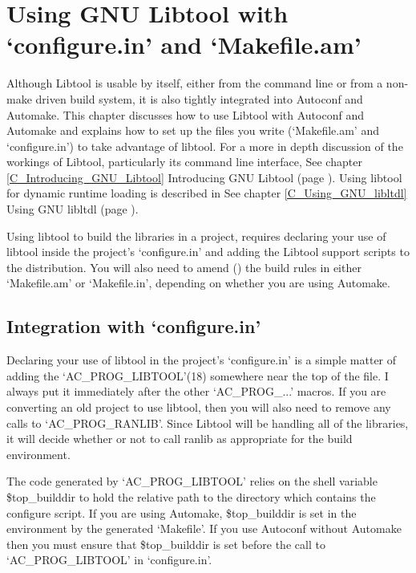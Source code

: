 \chapter{Using GNU Libtool with `configure.in' and `Makefile.am'}\label{C_Using GNU Libtool with}


Although Libtool is usable by itself, either from the command line or from 
a non-make driven build system, it is also tightly integrated into Autoconf 
and Automake. This chapter discusses how to use Libtool with Autoconf and 
Automake and explains how to set up the files you write (`Makefile.am' 
and `configure.in') to take advantage of libtool. For a more in depth 
discussion of the workings of Libtool, particularly its command line interface,
See chapter \ref{C_Introducing_GNU_Libtool} Introducing GNU Libtool
(page \pageref{C_Introducing_GNU_Libtool}). Using libtool for dynamic runtime 
loading is described in See chapter \ref{C_Using_GNU_libltdl} Using GNU libltdl
(page \pageref{C_Using_GNU_libltdl}). 


Using libtool to build the libraries in a project, requires declaring your use of libtool inside the project's `configure.in' and adding the Libtool support scripts to the distribution. You will also need to amend ({\MaQ{}}) the build rules in either `Makefile.am' or `Makefile.in', depending on whether you are using Automake. 

\section{Integration with `configure.in'}


Declaring your use of libtool in the project's `configure.in' is a simple matter of adding the `AC\_{}PROG\_{}LIBTOOL'(18) somewhere near the top of the file. I always put it immediately after the other `AC\_{}PROG\_{}...' macros. If you are converting an old project to use libtool, then you will also need to remove any calls to `AC\_{}PROG\_{}RANLIB'. Since Libtool will be handling all of the libraries, it will decide whether or not to call ranlib as appropriate for the build environment. 


The code generated by `AC\_{}PROG\_{}LIBTOOL' relies on the shell 
variable \$top\_{}builddir to hold the relative path to the directory which 
contains the configure script. If you are using Automake, \$top\_{}builddir 
is set in the environment by the generated `Makefile'. If you use Autoconf 
without Automake then you must ensure that \$top\_{}builddir is set before 
the call to `AC\_{}PROG\_{}LIBTOOL' in `configure.in'. 

